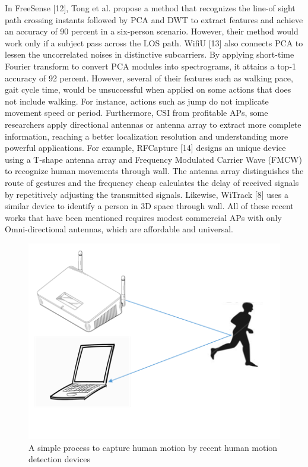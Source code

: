 \documentclass[conference]{IEEEtran}
\begin{document}
In FreeSense [12], Tong et al. propose a method that recognizes the line-of sight path crossing instants followed by PCA and DWT to extract features and achieve an accuracy of 90 percent in a six-person scenario. However, their method would work only if a subject pass across the LOS path. WifiU [13] also connects PCA to lessen the uncorrelated noises in distinctive subcarriers. By applying short-time Fourier transform to convert PCA modules into spectrograms, it attains a top-1 accuracy of 92 percent. However, several of their features such as walking pace, gait cycle time, would be unsuccessful when applied on some actions that does not include walking. For instance, actions such as jump do not implicate movement speed or period. \newline
Furthermore, CSI from profitable APs, some researchers apply directional antennas or antenna array to extract more complete information, reaching a better localization resolution and understanding more powerful applications. For example, RFCapture [14] designs an unique device using a T-shape antenna array and Frequency Modulated Carrier Wave (FMCW) to recognize human movements through wall. The antenna array distinguishes the route of gestures and the frequency cheap calculates the delay of received signals by repetitively adjusting the transmitted signals. Likewise, WiTrack [8] uses a similar device to identify a person in 3D space through wall. All of these recent works that have been mentioned requires modest commercial APs with only Omni-directional antennas, which are affordable and universal.

\begin{figure}[h!]
    \includegraphics[scale=0.45]{fig16.png}
    \caption{A simple process to capture human motion by recent human motion detection devices}
    \label{fig:me}
\end{figure}
\end{document}
